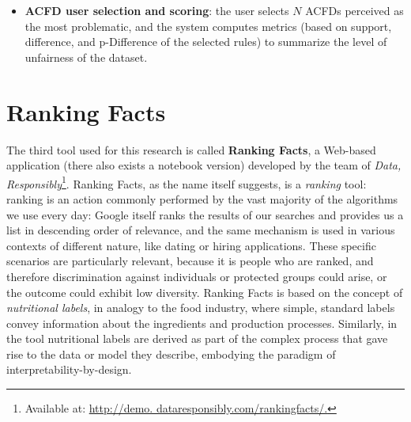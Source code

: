 \begin{itemize}
\item \textbf{ACFD user selection and scoring}: the user selects \(N\) ACFDs perceived as the most problematic, and the system computes metrics (based on support, difference, and p-Difference of the selected rules) to summarize the level of unfairness of the dataset.
\end{itemize}


\section{Ranking Facts}
\label{section:ranking_facts}
The third tool used for this research is called \textbf{Ranking Facts}, a Web-based application (there also exists a notebook version) developed by the team of \textit{Data, Responsibly}\footnote{Available at: \url{http://demo. dataresponsibly.com/rankingfacts/.}}. Ranking Facts, as the name itself suggests, is a \textit{ranking} tool: ranking is an action commonly performed by the vast majority of the algorithms we use every day: Google itself ranks the results of our searches and provides us a list in descending order of relevance, and the same mechanism is used in various contexts of different nature, like dating or hiring applications. These specific scenarios are particularly relevant, because it is people who are ranked, and therefore discrimination against individuals or protected groups could arise, or the outcome could exhibit low diversity. Ranking Facts is based on the concept of \textit{nutritional labels}, in analogy to the food industry, where simple, standard labels convey information about the ingredients and production processes. Similarly, in the tool nutritional labels are derived as part of the complex process that gave rise to the data or model they describe, embodying the paradigm of interpretability-by-design.

